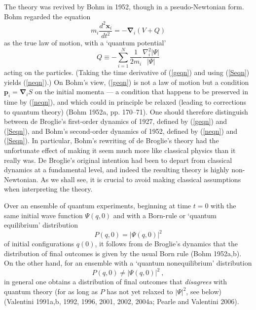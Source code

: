 \documentclass{article}%
\begin{document}
The theory was revived by Bohm in 1952, though in a pseudo-Newtonian form.
Bohm regarded the equation%
\begin{equation}
m_{i}\frac{d^{2}\mathbf{x}_{i}}{dt^{2}}=-\mathbf{\nabla}_{i}(V+Q) \label{neqn}%
\end{equation}
as the true law of motion, with a `quantum potential'%
\[
Q\equiv-\sum_{i=1}^{N}\frac{1}{2m_{i}}\frac{\nabla_{i}^{2}\left\vert
\Psi\right\vert }{\left\vert \Psi\right\vert }%
\]
acting on the particles. (Taking the time derivative of (\ref{geqn}) and using
(\ref{Seqn}) yields (\ref{neqn}).) On Bohm's view, (\ref{geqn}) is not a law
of motion but a condition $\mathbf{p}_{i}=\mathbf{\nabla}_{i}S$ on the initial
momenta --- a condition that happens to be preserved in time by (\ref{neqn}),
and which could in principle be relaxed (leading to corrections to quantum
theory) (Bohm 1952a, pp. 170--71). One should therefore distinguish between de
Broglie's first-order dynamics of 1927, defined by (\ref{geqn}) and
(\ref{Seqn}), and Bohm's second-order dynamics of 1952, defined by
(\ref{neqn}) and (\ref{Seqn}). In particular, Bohm's rewriting of de Broglie's
theory had the unfortunate effect of making it seem much more like classical
physics than it really was. De Broglie's original intention had been to depart
from classical dynamics at a fundamental level, and indeed the resulting
theory is highly non-Newtonian. As we shall see, it is crucial to avoid making
classical assumptions when interpreting the theory.

Over an ensemble of quantum experiments, beginning at time $t=0$ with the same
initial wave function $\Psi(q,0)$ and with a Born-rule or `quantum
equilibrium' distribution%
\begin{equation}
P(q,0)=\left\vert \Psi(q,0)\right\vert ^{2} \label{Br}%
\end{equation}
of initial configurations $q(0)$, it follows from de Broglie's dynamics that
the distribution of final outcomes is given by the usual Born rule (Bohm
1952a,b). On the other hand, for an ensemble with a `quantum nonequilibrium'
distribution%
\begin{equation}
P(q,0)\neq\left\vert \Psi(q,0)\right\vert ^{2}\ , \label{notBr}%
\end{equation}
in general one obtains a distribution of final outcomes that
\textit{disagrees} with quantum theory (for as long as $P$ has not yet relaxed
to $|\Psi|^{2}$, see below) (Valentini 1991a,b, 1992, 1996, 2001, 2002, 2004a;
Pearle and Valentini 2006).
\end{document}
